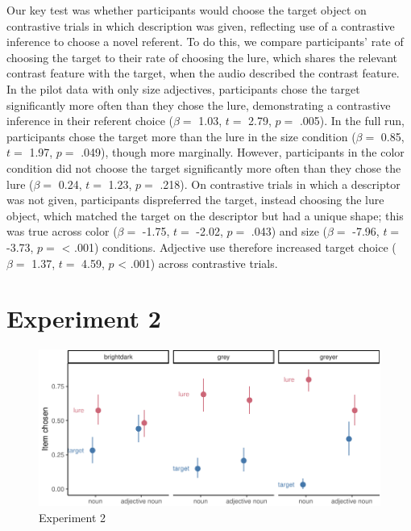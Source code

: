 \documentclass[10pt, letterpaper]{article}
\newenvironment{CodeChunk}{}{}
\begin{document}
Our key test was whether participants would choose the target object on
contrastive trials in which description was given, reflecting use of a
contrastive inference to choose a novel referent. To do this, we compare
participants' rate of choosing the target to their rate of choosing the
lure, which shares the relevant contrast feature with the target, when
the audio described the contrast feature. In the pilot data with only
size adjectives, participants chose the target significantly more often
than they chose the lure, demonstrating a contrastive inference in their
referent choice (\(\beta =\) 1.03, \(t =\) 2.79, \(p =\) .005). In the
full run, participants chose the target more than the lure in the size
condition (\(\beta =\) 0.85, \(t =\) 1.97, \(p =\) .049), though more
marginally. However, participants in the color condition did not choose
the target significantly more often than they chose the lure
(\(\beta =\) 0.24, \(t =\) 1.23, \(p =\) .218). On contrastive trials in
which a descriptor was not given, participants dispreferred the target,
instead choosing the lure object, which matched the target on the
descriptor but had a unique shape; this was true across color
(\(\beta =\) -1.75, \(t =\) -2.02, \(p =\) .043) and size (\(\beta =\)
-7.96, \(t =\) -3.73, \(p =\) \textless{} .001) conditions. Adjective
use therefore increased target choice (\(\beta =\) 1.37, \(t =\) 4.59,
\(p\) \textless{} .001) across contrastive trials.

\section{Experiment 2}\label{experiment-2}

\begin{CodeChunk}
\begin{figure}[tb]

{\centering \includegraphics{figs/e2_fig-1} 

}

\caption[Experiment 2]{Experiment 2}\label{fig:e2_fig}
\end{figure}
\end{CodeChunk}
\end{document}
